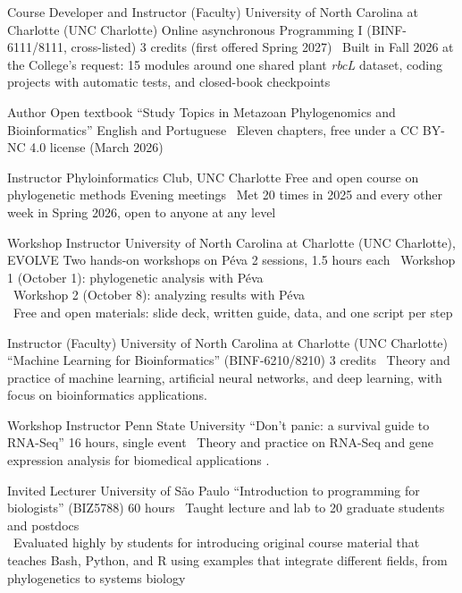 \documentclass[11pt, letterpaper, sans]{moderncv}
\begin{document}
	{Course Developer and Instructor (Faculty)}
	{University of North Carolina at Charlotte (UNC Charlotte)}
	{Online asynchronous Programming I (BINF-6111/8111, cross-listed)}
	{3 credits (first offered Spring 2027)}
	{
		\textbullet~Built in Fall 2026 at the College's request: 15 modules around one shared plant \textit{rbcL} dataset, coding projects with automatic tests, and closed-book checkpoints
	}

	{Author}
	{Open textbook}
	{``Study Topics in Metazoan Phylogenomics and Bioinformatics''}
	{English and Portuguese}
	{
		\textbullet~Eleven chapters, free under a CC BY-NC 4.0 license (March 2026)
	}

	{Instructor}
	{Phyloinformatics Club, UNC Charlotte}
	{Free and open course on phylogenetic methods}
	{Evening meetings}
	{
		\textbullet~Met 20 times in 2025 and every other week in Spring 2026, open to anyone at any level
	}

	{Workshop Instructor}
	{University of North Carolina at Charlotte (UNC Charlotte), EVOLVE}
	{Two hands-on workshops on Péva}
	{2 sessions, 1.5 hours each}
	{
		\textbullet~Workshop 1 (October 1): phylogenetic analysis with Péva\\
		\textbullet~Workshop 2 (October 8): analyzing results with Péva\\
		\textbullet~Free and open materials: slide deck, written guide, data, and one script per step
	}

	{Instructor (Faculty)}
	{University of North Carolina at Charlotte (UNC Charlotte)}
	{``Machine Learning for Bioinformatics'' (BINF-6210/8210)}
	{3 credits}
	{
		\textbullet~Theory and practice of machine learning, artificial neural networks, and deep learning, with focus on bioinformatics applications.
	}

	{Workshop Instructor}
	{Penn State University}
	{``Don't panic: a survival guide to RNA-Seq''}
	{16 hours, single event}
	{
		\textbullet~Theory and practice on RNA-Seq and gene expression analysis for biomedical applications .
	}

	{Invited Lecturer}
	{University of São Paulo}
	{``Introduction to programming for biologists'' (BIZ5788)}
	{60 hours}
	{
		\textbullet~Taught lecture and lab to 20 graduate students and postdocs\\
		\textbullet~Evaluated highly by students for introducing original course material that teaches Bash, Python, and R using examples that integrate different fields, from phylogenetics to systems biology
	}
\end{document}
